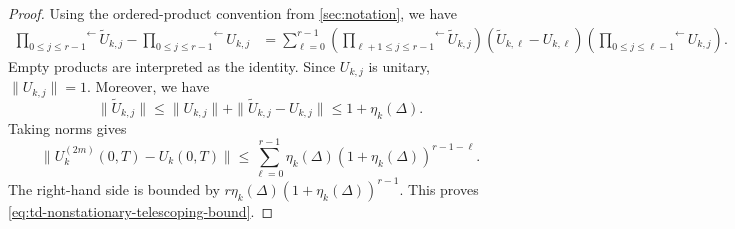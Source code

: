\documentclass[10pt,reqno]{article}
\numberwithin{equation}{section}
\theoremstyle{plain}
\theoremstyle{definition}
\begin{document}
\begin{proof}
Using the ordered-product convention from \cref{sec:notation}, we have
\begin{align}
\overset{\longleftarrow}{\prod_{0 \leq j \leq r-1}}\widetilde U_{k,j} - \overset{\longleftarrow}{\prod_{0 \leq j \leq r-1}}U_{k,j} &= \sum_{\ell=0}^{r-1} \left( \overset{\longleftarrow}{\prod_{\ell+1 \leq j \leq r-1}}\widetilde U_{k,j} \right) (\widetilde U_{k,\ell}-U_{k,\ell}) \left( \overset{\longleftarrow}{\prod_{0 \leq j \leq \ell -1}}U_{k,j} \right).
\end{align}
Empty products are interpreted as the identity.  Since \(U_{k,j}\) is unitary, \(\|U_{k,j}\|=1\).  Moreover, we have
\begin{equation}
\|\widetilde U_{k,j}\| \le \|U_{k,j}\| + \|\widetilde U_{k,j}-U_{k,j}\| \le 1+\eta_k(\Delta).
\end{equation}
Taking norms gives
\begin{equation}
\| U_k^{(2m)}(0,T)-U_k(0,T) \| \le \sum_{\ell=0}^{r-1} \eta_k(\Delta)\left(1+\eta_k(\Delta)\right)^{r-1-\ell}.
\end{equation}
The right-hand side is bounded by \(r\eta_k(\Delta)(1+\eta_k(\Delta))^{r-1}\). This proves \cref{eq:td-nonstationary-telescoping-bound}.
\end{proof}
\end{document}

